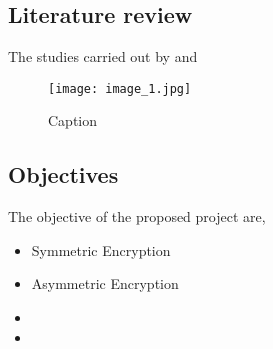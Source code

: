 \documentclass[12pt]{article}
\begin{document}
\newpage
\begin{flushleft}
\section*{\large {Literature review}}
The studies carried out by \cite{Smith:2012} and \citep{Smith:2013}

\end{flushleft}

\begin{figure}[structure.jpeg]
    \centering
    \texttt{[image: image\_1.jpg]}
    \caption{Caption}
    \label{fig:my_label}
\end{figure}



\newpage
\begin{flushleft}
\section*{\large {Objectives}}


The objective of the proposed project are, 
\begin{itemize}
    \item Symmetric Encryption
    \item  Asymmetric Encryption
\item \item
\end{itemize}
\end{flushleft}
\end{document}
